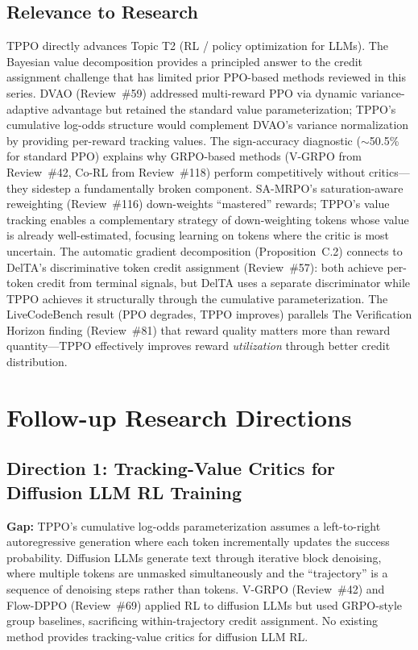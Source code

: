 \documentclass[11pt,a4paper]{article}
\begin{document}
\subsection{Relevance to Research}
TPPO directly advances Topic T2 (RL / policy optimization for LLMs). The Bayesian value decomposition provides a principled answer to the credit assignment challenge that has limited prior PPO-based methods reviewed in this series. DVAO (Review~\#59) addressed multi-reward PPO via dynamic variance-adaptive advantage but retained the standard value parameterization; TPPO's cumulative log-odds structure would complement DVAO's variance normalization by providing per-reward tracking values. The sign-accuracy diagnostic ($\sim$50.5\% for standard PPO) explains why GRPO-based methods (V-GRPO from Review~\#42, Co-RL from Review~\#118) perform competitively without critics---they sidestep a fundamentally broken component. SA-MRPO's saturation-aware reweighting (Review~\#116) down-weights ``mastered'' rewards; TPPO's value tracking enables a complementary strategy of down-weighting tokens whose value is already well-estimated, focusing learning on tokens where the critic is most uncertain. The automatic gradient decomposition (Proposition~C.2) connects to DelTA's discriminative token credit assignment (Review~\#57): both achieve per-token credit from terminal signals, but DelTA uses a separate discriminator while TPPO achieves it structurally through the cumulative parameterization. The LiveCodeBench result (PPO degrades, TPPO improves) parallels The Verification Horizon finding (Review~\#81) that reward quality matters more than reward quantity---TPPO effectively improves reward \emph{utilization} through better credit distribution.

\section{Follow-up Research Directions}

\subsection{Direction 1: Tracking-Value Critics for Diffusion LLM RL Training}
\textbf{Gap:} TPPO's cumulative log-odds parameterization assumes a left-to-right autoregressive generation where each token incrementally updates the success probability. Diffusion LLMs generate text through iterative block denoising, where multiple tokens are unmasked simultaneously and the ``trajectory'' is a sequence of denoising steps rather than tokens. V-GRPO (Review~\#42) and Flow-DPPO (Review~\#69) applied RL to diffusion LLMs but used GRPO-style group baselines, sacrificing within-trajectory credit assignment. No existing method provides tracking-value critics for diffusion LLM RL.
\end{document}
